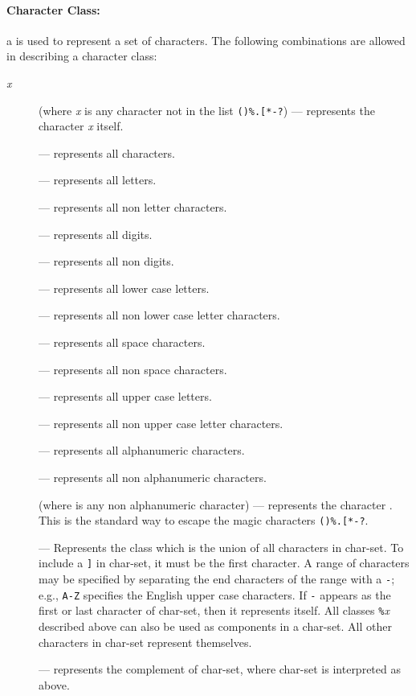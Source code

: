 \paragraph{Character Class:}
a  is used to represent a set of characters.
The following combinations are allowed in describing a character class:
\begin{description}
\item[\emph{x}] (where \emph{x} is any character not in the list \verb|()%.[*-?|)
--- represents the character \emph{x} itself.
\item[] --- represents all characters.
\item[] --- represents all letters.
\item[] --- represents all non letter characters.
\item[] --- represents all digits.
\item[] --- represents all non digits.
\item[] --- represents all lower case letters.
\item[] --- represents all non lower case letter characters.
\item[] --- represents all space characters.
\item[] --- represents all non space characters.
\item[] --- represents all upper case letters.
\item[] --- represents all non upper case letter characters.
\item[] --- represents all alphanumeric characters.
\item[] --- represents all non alphanumeric characters.
\item[] (where  is any non alphanumeric character)  ---
represents the character .
This is the standard way to escape the magic characters \verb|()%.[*-?|.
\item[] ---
Represents the class which is the union of all
characters in char-set.
To include a \verb|]| in char-set, it must be the first character.
A range of characters may be specified by
separating the end characters of the range with a \verb|-|;
e.g., \verb|A-Z| specifies the English upper case characters.
If \verb|-| appears as the first or last character of char-set,
then it represents itself.
All classes \verb|%|\emph{x} described above can also be used as
components in a char-set.
All other characters in char-set represent themselves.
\item[] ---
represents the complement of char-set,
where char-set is interpreted as above.
\end{description}

